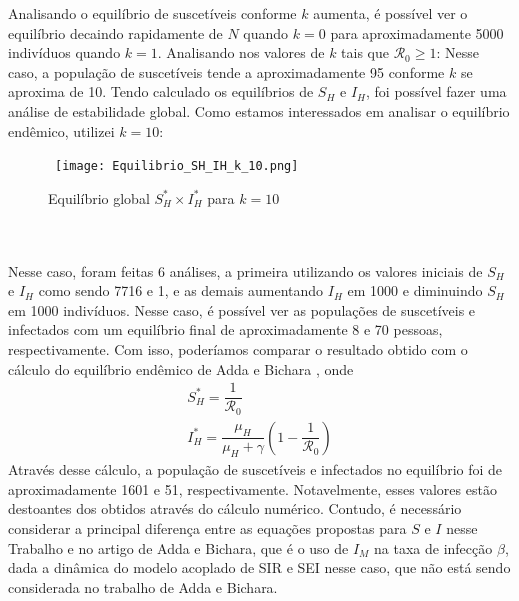 Analisando o equilíbrio de suscetíveis conforme $k$ aumenta, é possível 
ver o equilíbrio decaindo rapidamente
de $N$ quando $k=0$ para aproximadamente 5000 indivíduos quando $k=1$. Analisando 
nos valores de $k$ tais que $\mathcal{R}_0 \geq 1$:
\newpage
Nesse caso, a população de suscetíveis tende a aproximadamente 95 conforme 
$k$ se aproxima de 10. Tendo calculado os equilíbrios de $S_H$ e $I_H$,
foi possível fazer uma análise de estabilidade global. Como estamos interessados
em analisar o equilíbrio endêmico, utilizei $k=10$:
\begin{figure}[!ht]
        \centering
        \hbox{\hspace{2.2em} \texttt{[image: Equilibrio\_SH\_IH\_k\_10.png]}}
        \caption{Equilíbrio global $S_H^* \times I_H^*$ para $k=10$}
\end{figure}
\\\\
Nesse caso, foram feitas 6 análises, a primeira utilizando os
valores iniciais de $S_H$ e $I_H$ como sendo 7716 e 1, e as demais aumentando $I_H$ 
em 1000 e diminuindo $S_H$ em 1000 indivíduos. Nesse caso, é possível
ver as populações de suscetíveis e infectados com um equilíbrio final de
aproximadamente 8 e 70 pessoas, respectivamente. Com isso,
poderíamos comparar o resultado obtido com o cálculo do equilíbrio endêmico de Adda e Bichara
\cite{adda2011global}, onde
\begin{gather*}
        S_H^* = \dfrac{1}{\mathcal{R}_0} \\
        I_H^* = \dfrac{\mu_H}{\mu_H+\gamma}(1-\dfrac{1}{\mathcal{R}_0})
\end{gather*}       
Através desse cálculo, a população de suscetíveis e infectados no equilíbrio 
foi de aproximadamente 1601 e 51, respectivamente. Notavelmente, esses valores 
estão destoantes dos 
obtidos através do cálculo numérico. Contudo, é necessário considerar a principal diferença entre as equações
propostas para $S$ e $I$ nesse Trabalho e no artigo de Adda e Bichara, que é o uso de
$I_M$ na taxa de infecção $\beta$, dada a dinâmica do modelo 
acoplado de SIR e SEI nesse caso, que não está sendo considerada no trabalho
de Adda e Bichara.